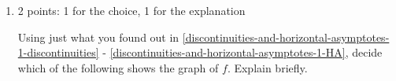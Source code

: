 \documentclass{article}
\begin{document}
\begin{enumerate}
\begin{enumerate}
\begin{solution}
      First let's consider the limit as $x$ goes to $-\infty$.
      \begin{align*}
        \lim_{x \to -\infty} f(x) &= \lim_{x \to -\infty} \frac{3x}{x-3} \\
        \intertext{The dominant term in the denominator as $x \to -\infty$ is $x$.}
        &= \lim_{x \to -\infty} \frac{3x}{x} \\
        &= \lim_{x \to -\infty} 3 \\
        &= 3.
      \end{align*}

      Now let's consider the limit as $x$ goes to $\infty$. 
      \begin{align*}
        \lim_{x \to \infty} f(x) &= \lim_{x \to \infty} \frac{3x}{x-3} \\
        \intertext{The dominant term in the denominator as $x \to \infty$ is $x$.}
        &= \lim_{x \to \infty} \frac{3x}{x} \\
        &= \lim_{x \to \infty} 3 \\
        &= 3.
      \end{align*}
      This shows that the graph of $y=f(x)$ has one horizontal asymptote, $y=3$.
    \end{solution}

  \item 

    \begin{grading}
      2 points: 1 for the choice, 1 for the explanation 
    \end{grading}

    \begin{problem}[\nstretch{0.35}]
      Using just what you found out in \ref{discontinuities-and-horizontal-asymptotes-1-discontinuities} - \ref{discontinuities-and-horizontal-asymptotes-1-HA}, decide which of the following shows the graph of $f$. Explain briefly.


\end{problem}
\end{enumerate}
\end{enumerate}
\end{document}
